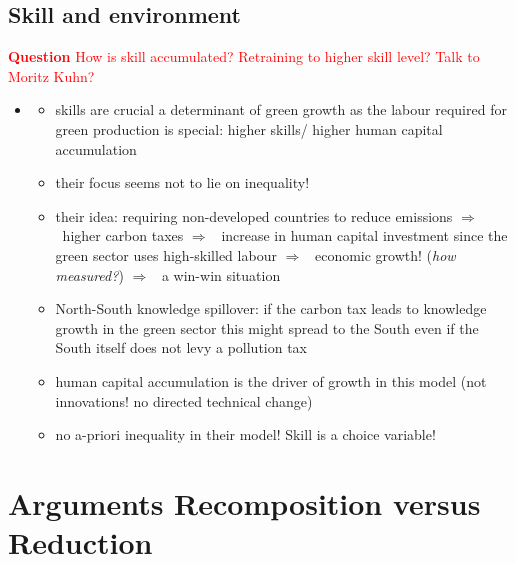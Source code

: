 \documentclass[12pt]{article}
\newcommand{\ar}{$\Rightarrow$ \ }
\newcommand{\tr}[1]{\textcolor{red}{#1}}
\begin{document}
\subsection{Skill and environment}
\tr{\textbf{Question} How is skill accumulated? Retraining to higher skill level? Talk to Moritz Kuhn?}
\begin{itemize}
\item \cite{Borissov2019CarbonDevelopment}
\begin{itemize}
\item skills are crucial a determinant of green growth as the labour required for green production is special: higher skills/ higher human capital accumulation
\item their focus seems not to lie on inequality!
\item their idea: requiring non-developed countries to reduce emissions \ar higher carbon taxes \ar increase in human capital investment since the green sector uses high-skilled labour \ar economic growth! (\textit{how measured?}) \ar a win-win situation
\item North-South knowledge spillover: if the carbon tax leads to knowledge growth in the green sector this might spread to the South even if the South itself does not levy a pollution tax
\item human capital accumulation is the driver of growth in this model (not innovations! no directed technical change)
\item no a-priori inequality in their model! Skill is a choice variable! 
\end{itemize}
\end{itemize}

\section{Arguments Recomposition versus Reduction}
\end{document}
